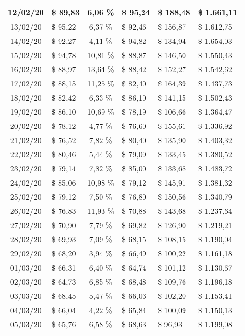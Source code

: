 \begin{center}
\begin{small}
\begin{longtable}{|c|l|c|l|l|l|}
12/02/20 & \$ 89,83 & 6,06 \% & \$ 95,24 & \$ 188,48 & \$ 1.661,11 \\ \hline
13/02/20 & \$ 95,22 & 6,37 \% & \$ 92,46 & \$ 156,87 & \$ 1.612,75 \\ \hline
14/02/20 & \$ 92,27 & 4,11 \% & \$ 94,82 & \$ 134,94 & \$ 1.654,03 \\ \hline
15/02/20 & \$ 94,78 & 10,81 \% & \$ 88,87 & \$ 146,50 & \$ 1.550,43 \\ \hline
16/02/20 & \$ 88,97 & 13,64 \% & \$ 88,42 & \$ 152,27 & \$ 1.542,62 \\ \hline
17/02/20 & \$ 88,15 & 11,26 \% & \$ 82,40 & \$ 164,39 & \$ 1.437,73 \\ \hline
18/02/20 & \$ 82,42 & 6,33 \% & \$ 86,10 & \$ 141,15 & \$ 1.502,43 \\ \hline
19/02/20 & \$ 86,10 & 10,69 \% & \$ 78,19 & \$ 106,66 & \$ 1.364,47 \\ \hline
20/02/20 & \$ 78,12 & 4,77 \% & \$ 76,60 & \$ 155,61 & \$ 1.336,92 \\ \hline
21/02/20 & \$ 76,52 & 7,82 \% & \$ 80,40 & \$ 135,90 & \$ 1.403,32 \\ \hline
22/02/20 & \$ 80,46 & 5,44 \% & \$ 79,09 & \$ 133,45 & \$ 1.380,52 \\ \hline
23/02/20 & \$ 79,14 & 7,82 \% & \$ 85,00 & \$ 133,68 & \$ 1.483,72 \\ \hline
24/02/20 & \$ 85,06 & 10,98 \% & \$ 79,12 & \$ 145,91 & \$ 1.381,32 \\ \hline
25/02/20 & \$ 79,12 & 7,50 \% & \$ 76,80 & \$ 150,56 & \$ 1.340,79 \\ \hline
26/02/20 & \$ 76,83 & 11,93 \% & \$ 70,88 & \$ 143,68 & \$ 1.237,64 \\ \hline
27/02/20 & \$ 70,90 & 7,79 \% & \$ 69,82 & \$ 126,90 & \$ 1.219,21 \\ \hline
28/02/20 & \$ 69,93 & 7,09 \% & \$ 68,15 & \$ 108,15 & \$ 1.190,04 \\ \hline
29/02/20 & \$ 68,20 & 3,94 \% & \$ 66,49 & \$ 100,22 & \$ 1.161,18 \\ \hline
01/03/20 & \$ 66,31 & 6,40 \% & \$ 64,74 & \$ 101,12 & \$ 1.130,67 \\ \hline
02/03/20 & \$ 64,73 & 6,85 \% & \$ 68,48 & \$ 109,76 & \$ 1.196,18 \\ \hline
03/03/20 & \$ 68,45 & 5,47 \% & \$ 66,03 & \$ 102,20 & \$ 1.153,41 \\ \hline
04/03/20 & \$ 66,04 & 4,22 \% & \$ 65,84 & \$ 100,09 & \$ 1.150,13 \\ \hline
05/03/20 & \$ 65,76 & 6,58 \% & \$ 68,63 & \$ 96,93 & \$ 1.199,08 \\ \hline

\end{longtable}
\end{small}
\end{center}
